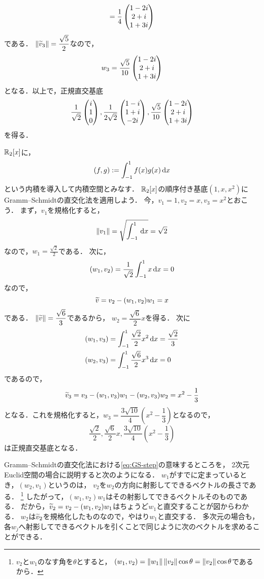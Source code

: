 \begin{example}
\[\begin{aligned}
    = \frac{1}{4}\begin{pmatrix} 1-2i \\ 2 + i \\ 1 + 3i \end{pmatrix}
  \end{aligned}
\]
である．
$\left\| \widetilde{v}_3 \right\| =  \dfrac{\sqrt{5}}{2}$なので，
\[
  w_3 = \frac{\sqrt{5}}{10}\begin{pmatrix} 1-2i \\ 2+i \\ 1+3i \end{pmatrix}  
\]
となる．以上で，正規直交基底
\[
  \frac{1}{\sqrt{2}}\begin{pmatrix} i \\ 1 \\ 0 \end{pmatrix},
  \frac{1}{2\sqrt{2}} \begin{pmatrix} 1-i \\ 1+i \\ -2i \end{pmatrix},
  \frac{\sqrt{5}}{10}\begin{pmatrix} 1-2i \\ 2+i \\ 1+3i \end{pmatrix}
\]
を得る．
\end{example}
\begin{example}
$\mathbb{R}_2[x]$に，
\[
(f,g) := \int_{-1}^{1} f(x)g(x) \,\mathrm{d} x  
\]
という内積を導入して内積空間とみなす．
$\mathbb{R}_2[x]$の順序付き基底$(1,x,x^2)$にGramm--Schmidtの直交化法を適用しよう．
今，$v_1 = 1, v_2 = x, v_3 = x^2$とおこう．
まず，$v_1$を規格化すると，
\[
  \left\| v_1 \right\| = \sqrt{\int_{-1}^{1} \,\mathrm{d} x} = \sqrt{2}
\]
なので，$w_1 = \frac{\sqrt{2}}{2}$である．
次に，
\[
  (w_1, v_2) = \frac{1}{\sqrt{2}}\int_{-1}^1 x \,\mathrm{d} x = 0 
\]
なので，
\[
  \widetilde{v} = v_2 - (w_1,v_2)w_1 = x
\]
である．
$\left\| \widetilde{v} \right\| = \dfrac{\sqrt{6}}{3}$であるから，
$w_2 = \dfrac{\sqrt{6}}{2} x$を得る．
次に
\[
  \begin{aligned}
    (w_1, v_3) &= \int_{-1}^1 \frac{\sqrt{2}}{2}x^2 \id x %
    = \frac{\sqrt{2}}{3} \\
    (w_2, v_3) &= \int_{-1}^1 \frac{\sqrt{6}}{2}x^3 \id x = 0
  \end{aligned}  
\]
であるので，
\[
    \widetilde{v}_3 = v_3 - (w_1, v_3)w_1 - (w_2, v_3)w_2
    = x^2 - \frac{1}{3}
\]
となる．これを規格化すると，$w_3 = \dfrac{3\sqrt{10}}{4}\left(x^2 - \dfrac{1}{3} \right)$となるので，
\[
  \frac{\sqrt{2}}{2}, \frac{\sqrt{6}}{2} x, \frac{3\sqrt{10}}{4}\left(x^2 - \frac{1}{3} \right)
\]
は正規直交基底となる．
\end{example}
Gramm--Schmidtの直交化法における\eqref{eq:GS-step}の意味するところを，
2次元Euclid空間の場合に説明すると次のようになる．
$w_1$がすでに定まっているとき，$(w_2,v_1)$というのは，
$v_2$を$w_2$の方向に射影してできるベクトルの長さである．
\footnote{$v_2$と$w_1$のなす角を$\theta$とすると，
$(w_1,v_2)=\left\| w_1 \right\|\left\| v_2 \right\|\cos \theta = \left\| v_2 \right\|\cos \theta$であるから．}
したがって，$(w_1,v_2) w_1$はその射影してできるベクトルそのものである．
だから，$\widetilde{v}_2 = v_2 - (w_1,v_2) w_1$はちょうど$w_1$と直交することが図からわかる．
$w_2$は$\widetilde{v}_2$を規格化したものなので，やはり$w_1$と直交する．
多次元の場合も，各$w_j$へ射影してできるベクトルを引くことで同じように次のベクトルを求めることができる．


